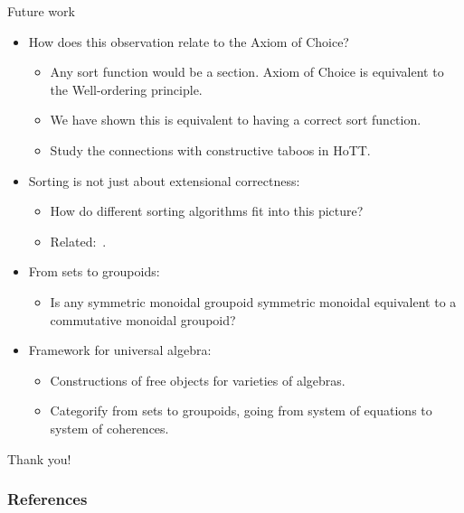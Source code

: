 \documentclass[9pt]{beamer}
\begin{document}
\begin{frame}{Future work}

\begin{itemize}
  \item How does this observation relate to the Axiom of Choice?
    \begin{itemize}
      \item Any sort function would be a section. Axiom of Choice is equivalent to the Well-ordering principle. %
        \item We have shown this is equivalent to having a correct sort function.
        \item Study the connections with constructive taboos in HoTT.
    \end{itemize}
    \item Sorting is not just about extensional correctness:
    \begin{itemize}
        \item How do different sorting algorithms fit into this picture?
        \item Related:~\cite{hinzeSortingBialgebrasDistributive2012}.
    \end{itemize}    
    \item From sets to groupoids:
    \begin{itemize}
        \item Is any symmetric monoidal groupoid symmetric monoidal equivalent to a commutative monoidal groupoid?
    \end{itemize}
    \item Framework for universal algebra:
    \begin{itemize}
        \item Constructions of free objects for varieties of algebras.
        \item Categorify from sets to groupoids, going from system of equations to system of coherences.
    \end{itemize}
\end{itemize}

\end{frame}

\begin{frame}[standout]
    Thank you!
\end{frame}


\begin{frame}[allowframebreaks]
    \frametitle{References}
    \printbibliography[heading=none]
\end{frame}
\end{document}
